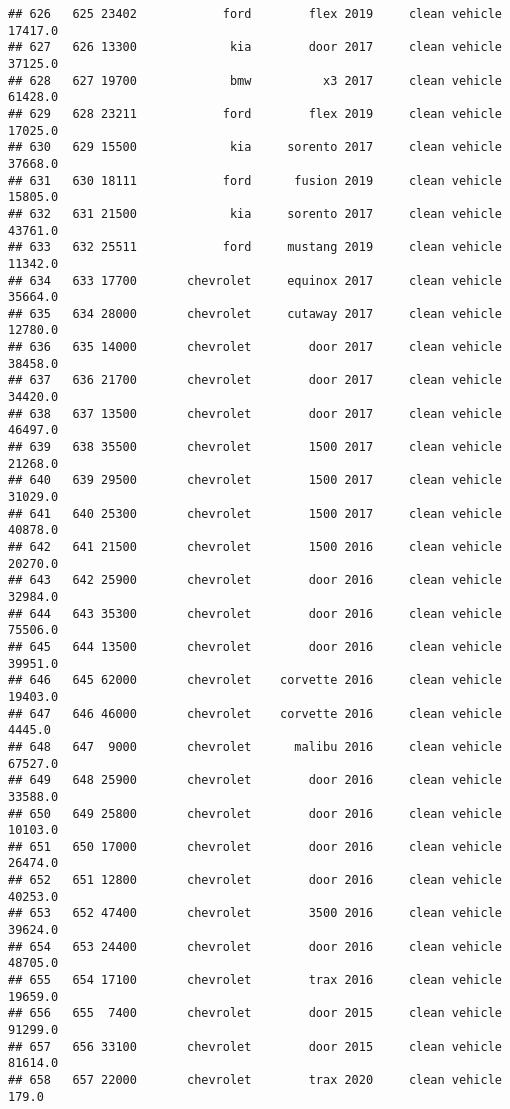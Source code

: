 \documentclass[
]{article}
\begin{document}
\begin{verbatim}
## 626   625 23402            ford        flex 2019     clean vehicle   17417.0
## 627   626 13300             kia        door 2017     clean vehicle   37125.0
## 628   627 19700             bmw          x3 2017     clean vehicle   61428.0
## 629   628 23211            ford        flex 2019     clean vehicle   17025.0
## 630   629 15500             kia     sorento 2017     clean vehicle   37668.0
## 631   630 18111            ford      fusion 2019     clean vehicle   15805.0
## 632   631 21500             kia     sorento 2017     clean vehicle   43761.0
## 633   632 25511            ford     mustang 2019     clean vehicle   11342.0
## 634   633 17700       chevrolet     equinox 2017     clean vehicle   35664.0
## 635   634 28000       chevrolet     cutaway 2017     clean vehicle   12780.0
## 636   635 14000       chevrolet        door 2017     clean vehicle   38458.0
## 637   636 21700       chevrolet        door 2017     clean vehicle   34420.0
## 638   637 13500       chevrolet        door 2017     clean vehicle   46497.0
## 639   638 35500       chevrolet        1500 2017     clean vehicle   21268.0
## 640   639 29500       chevrolet        1500 2017     clean vehicle   31029.0
## 641   640 25300       chevrolet        1500 2017     clean vehicle   40878.0
## 642   641 21500       chevrolet        1500 2016     clean vehicle   20270.0
## 643   642 25900       chevrolet        door 2016     clean vehicle   32984.0
## 644   643 35300       chevrolet        door 2016     clean vehicle   75506.0
## 645   644 13500       chevrolet        door 2016     clean vehicle   39951.0
## 646   645 62000       chevrolet    corvette 2016     clean vehicle   19403.0
## 647   646 46000       chevrolet    corvette 2016     clean vehicle    4445.0
## 648   647  9000       chevrolet      malibu 2016     clean vehicle   67527.0
## 649   648 25900       chevrolet        door 2016     clean vehicle   33588.0
## 650   649 25800       chevrolet        door 2016     clean vehicle   10103.0
## 651   650 17000       chevrolet        door 2016     clean vehicle   26474.0
## 652   651 12800       chevrolet        door 2016     clean vehicle   40253.0
## 653   652 47400       chevrolet        3500 2016     clean vehicle   39624.0
## 654   653 24400       chevrolet        door 2016     clean vehicle   48705.0
## 655   654 17100       chevrolet        trax 2016     clean vehicle   19659.0
## 656   655  7400       chevrolet        door 2015     clean vehicle   91299.0
## 657   656 33100       chevrolet        door 2015     clean vehicle   81614.0
## 658   657 22000       chevrolet        trax 2020     clean vehicle     179.0

\end{verbatim}
\end{document}
